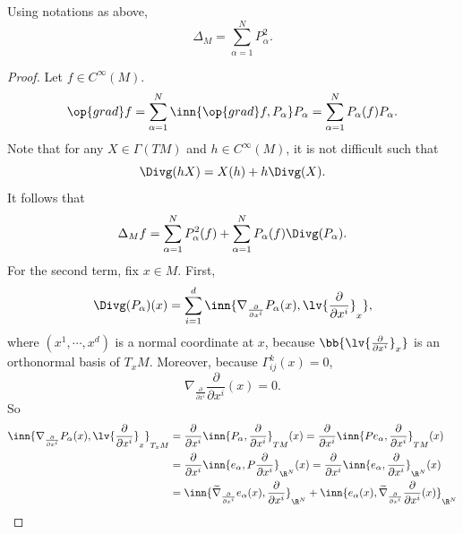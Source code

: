 \begin{thm}
    Using notations as above,
    \begin{equation*}
        \Delta_M = \sum_{\alpha = 1}^N P_\alpha^2.
    \end{equation*}
\end{thm}
\begin{proof}
    Let $f \in C^\infty(M)$.
    \begin{equation*}
        \op{grad}f = \sum_{\alpha=1}^N \inn{\op{grad}f,P_\alpha}P_\alpha = \sum_{\alpha=1}^N P_\alpha(f)P_\alpha.
    \end{equation*}
    Note that for any $X \in \Gamma(TM)$ and $h \in C^\infty(M)$, it is not difficult such that
    \begin{equation*}
        \Divg (hX) = X(h) + h\Divg (X).
    \end{equation*}
    It follows that
    \begin{equation*}
        \Delta_M f = \sum_{\alpha=1}^N P_\alpha^2(f) + \sum_{\alpha=1}^N P_\alpha(f)\Divg(P_\alpha).
    \end{equation*}
    For the second term, fix $x \in M$. First,
    \begin{equation*}
        \Divg(P_\alpha)(x) = \sum_{i=1}^d \inn{\nabla_{\frac{\partial}{\partial x^i}}P_\alpha(x),\lv{\frac{\partial}{\partial x^i}}_{x}},
    \end{equation*}
    where $(x^1,\cdots,x^d)$ is a normal coordinate at $x$, because $\bb{\lv{\frac{\partial}{\partial x^i}}_{x}}$ is an orthonormal basis of $T_xM$. Moreover, because $\Gamma^k_{ij}(x) = 0$,
    \begin{equation*}
        \nabla_{\frac{\partial}{\partial x^i}}\frac{\partial}{\partial x^i} (x) = 0.
    \end{equation*}
    So
    \begin{align*}
        \inn{\nabla_{\frac{\partial}{\partial x^i}}P_\alpha(x),\lv{\frac{\partial}{\partial x^i}}_{x}}_{T_xM} &= \frac{\partial}{\partial x^i}\inn{P_\alpha, \frac{\partial}{\partial x^i}}_{TM} (x) = \frac{\partial}{\partial x^i}\inn{Pe_\alpha, \frac{\partial}{\partial x^i}}_{TM} (x) \\
        &= \frac{\partial}{\partial x^i}\inn{e_\alpha, P\frac{\partial}{\partial x^i}}_{\R^N} (x) = \frac{\partial}{\partial x^i}\inn{e_\alpha, \frac{\partial}{\partial x^i}}_{\R^N} (x) \\
        &= \inn{\widetilde{\nabla}_{\frac{\partial}{\partial x^i}}e_\alpha(x), \frac{\partial}{\partial x^i}}_{\R^N} + \inn{e_\alpha(x), \widetilde{\nabla}_{\frac{\partial}{\partial x^i}}\frac{\partial}{\partial x^i}(x)}_{\R^N} \\

\end{align*}
\end{proof}
